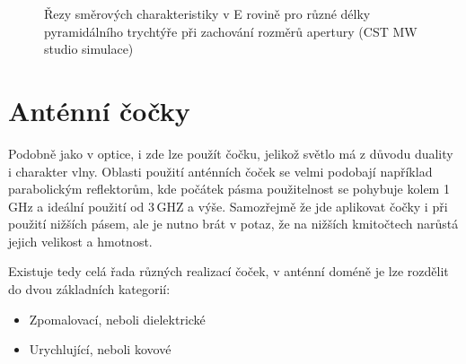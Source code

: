 \begin{figure}[!htbp]
\caption{Řezy směrových charakteristiky v E rovině pro různé délky pyramidálního trychtýře při zachování rozměrů apertury (CST MW studio simulace)}
\label{fig:HornLenDep}
\end{figure}

\newpage
\section{Anténní čočky}
Podobně jako v optice, i zde lze použít čočku, jelikož světlo má z důvodu duality i charakter vlny.
Oblasti použití anténních čoček se velmi podobají například parabolickým reflektorům, kde počátek pásma použitelnost se pohybuje kolem 1\,GHz a ideální použití od 3\,GHZ a výše. Samozřejmě že jde aplikovat čočky i při použití nižších pásem, ale je nutno brát v potaz, že na nižších kmitočtech narůstá jejich velikost a hmotnost. 

Existuje tedy celá řada různých realizací čoček, v anténní doméně je lze rozdělit do dvou základních kategorií:
\begin{itemize}
\item Zpomalovací, neboli dielektrické
\item Urychlující, neboli kovové
\end{itemize}

